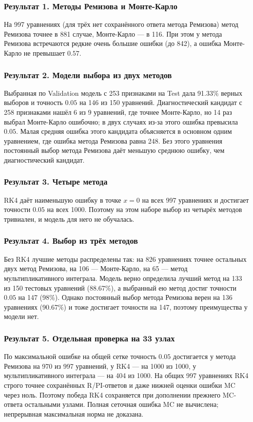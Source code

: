 \documentclass[14pt,a4paper]{extarticle}
\begin{document}
\subsubsection*{Результат 1. Методы Ремизова и Монте-Карло}
На 997 уравнениях (для трёх нет сохранённого ответа метода Ремизова)
метод Ремизова точнее в 881 случае, Монте-Карло --- в 116. При этом
у метода Ремизова встречаются редкие очень большие ошибки (до 842),
а ошибка Монте-Карло не превышает $0.57$.

\subsubsection*{Результат 2. Модели выбора из двух методов}
Выбранная по Validation модель с 253 признаками на Test дала
91.33\% верных выборов и точность $0.05$ на 146 из 150 уравнений.
Диагностический кандидат с 258 признаками нашёл 6 из 9 уравнений, где точнее
Монте-Карло, но 14 раз выбрал Монте-Карло ошибочно; в двух случаях
из-за этого ошибка превысила $0.05$. Малая средняя ошибка этого кандидата
объясняется в основном одним уравнением, где ошибка метода Ремизова
равна 248. Без этого уравнения постоянный выбор метода Ремизова даёт
меньшую среднюю ошибку, чем диагностический кандидат.

\subsubsection*{Результат 3. Четыре метода}
RK4 даёт наименьшую ошибку в точке $x=0$ на всех 997 уравнениях
и достигает точности $0.05$ на всех 1000. Поэтому на этом наборе выбор
из четырёх методов тривиален, и модель для него не обучалась.

\subsubsection*{Результат 4. Выбор из трёх методов}
Без RK4 лучшие методы распределены так: на 826 уравнениях точнее
остальных двух метод Ремизова, на 106 --- Монте-Карло, на 65 --- метод
мультипликативного интеграла. Модель верно определила лучший метод на 133 из 150
тестовых уравнений (88.67\%), а выбранный ею метод достиг точности $0.05$
на 147 (98\%). Однако постоянный выбор метода Ремизова верен на 136
уравнениях (90.67\%) и тоже достигает точности на 147, поэтому
преимущества у модели нет.

\subsubsection*{Результат 5. Отдельная проверка на 33 узлах}
По максимальной ошибке на общей сетке точность $0.05$ достигается
у метода Ремизова на 970 из 997 уравнений, у RK4 --- на 1000 из 1000,
у мультипликативного интеграла --- на 404 из 1000. На общих 997
уравнениях RK4 строго точнее сохранённых R/PI-ответов и даже нижней
оценки ошибки MC через ноль. Поэтому победа RK4 сохраняется при
дополнении прежнего MC-ответа остальными узлами. Полная сеточная
ошибка MC не вычислена; непрерывная максимальная норма не доказана.
\end{document}
